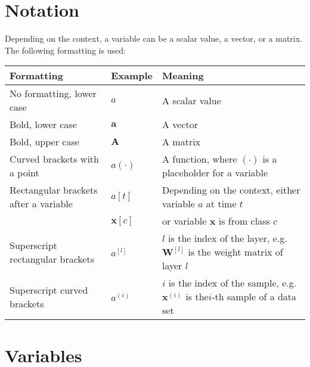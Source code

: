 

\section{Notation}

Depending on the context, a variable can be a scalar value, a vector, or a matrix. The following formatting is used:

\begin{tabular}{ p{4cm} p{3cm} p{7cm} }
	\textbf{Formatting} & \textbf{Example} & \textbf{Meaning}\\
	\hline
  	No formatting, lower case & $a$ & A scalar value\\
  	Bold, lower case & $\boldsymbol{a}$ & A vector\\
  	Bold, upper case & $\boldsymbol{A}$ & A matrix\\
  	Curved brackets with a point & $a(\cdot)$ & A function, where $(\cdot)$ is a placeholder for a variable\\
  	Rectangular brackets after a variable & $a[t]$ & Depending on the context, either variable $a$ at time $t$\\
  	                                      & $\boldsymbol{x}[c]$ & or variable $\boldsymbol{x}$ is from class $c$\\
  	Superscript rectangular brackets & $a^{[l]}$ & $l$ is the index of the layer, e.g. $\boldsymbol{W}^{[l]}$ is the weight matrix of layer $l$\\
  	Superscript curved brackets & $a^{(i)}$ & $i$ is the index of the sample, e.g. $\boldsymbol{x}^{(i)}$ is the$i$-th sample of a data set\\
\end{tabular}


\section{Variables}

